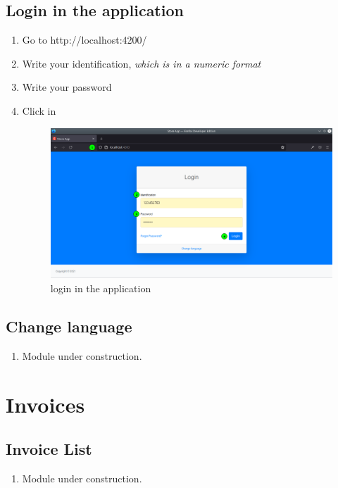 \documentclass[a4paper,11pt]{refart}
\newcommand\InConstruction{\color{red} Module under construction.}
\newcommand\SiteRanqhana{\textsf{http://localhost:4200/}}
\begin{document}
\subsection{Login in the application}\label{section:login_app}
\begin{enumerate}
\item Go to \SiteRanqhana
\item Write your identification, \emph{which is in a numeric format}
\item Write your password
\item Click in 
\begin{figure}[H]\centering
	\includegraphics[width=\textwidth]{images/login}
	\caption{login in the application}\label{fig:login}
\end{figure}
\end{enumerate}	

\subsection{Change language}\label{section:change_language}
\begin{enumerate}
	\item \InConstruction{}	
\end{enumerate}	

\section{Invoices}
\subsection{Invoice List}\label{section:invoice_list}
\begin{enumerate}
	\item \InConstruction{}
\end{enumerate}
\end{document}
